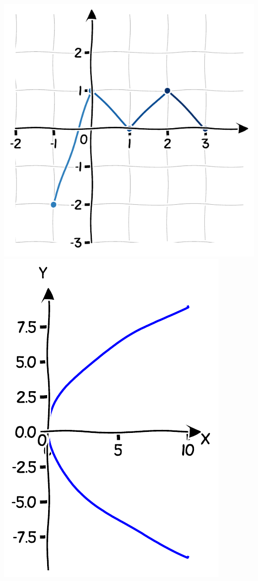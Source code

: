 \documentclass[a4paper]{article}
\begin{document}
\begin{minipage}[]{0.4\textwidth}
      \centering
      \includegraphics[scale=0.4]{../graph_drawing/f_function_test_1_1.pdf}
      \captionsetup{labelformat=empty}
      \vspace*{-4mm}
      \label{fig:function_example_1}
      \includegraphics[scale=0.45]{../graph_drawing/sideways_parabola_function_test_1.pdf}

\end{minipage}
\end{document}

